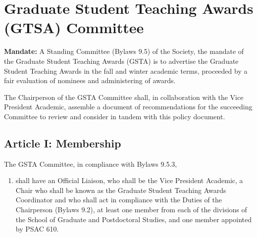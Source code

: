 \section{Graduate Student Teaching Awards (GTSA) Committee}

\textbf{Mandate:} A Standing Committee (Bylaws 9.5) of the Society, the mandate of the Graduate Student Teaching Awards (GSTA) is to advertise the Graduate Student Teaching Awards in the fall and winter academic terms, proceeded by a fair evaluation of nominees and administering of awards.\newline

The Chairperson of the GSTA Committee shall, in collaboration with the Vice President Academic, assemble a document of recommendations for the succeeding Committee to review and consider in tandem with this policy document. \newline

\subsection{Article I: Membership}   

The GSTA Committee, in compliance with Bylaws 9.5.3,
\begin{enumerate}

\item shall have an Official Liaison, who shall be the Vice President Academic, a Chair who shall be known as the Graduate Student Teaching Awards Coordinator and who shall act in compliance with the Duties of the Chairperson (Bylaws 9.2), at least one member from each of the divisions of the School of Graduate and Postdoctoral Studies, and one member appointed by PSAC 610.


\end{enumerate}

